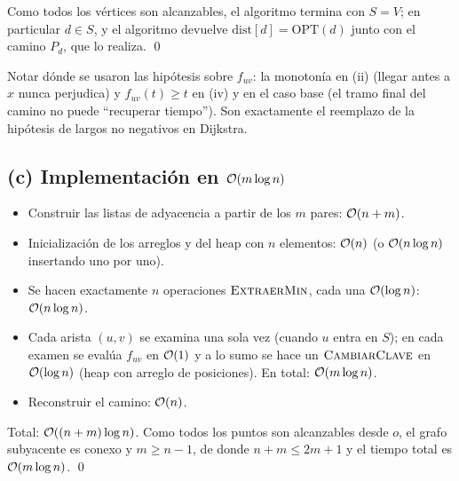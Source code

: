 Como todos los vértices son alcanzables, el algoritmo termina con $S=V$; en particular $d\in S$, y el algoritmo devuelve $\mathrm{dist}[d]=\mathrm{OPT}(d)$ junto con el camino $P_d$, que lo realiza. \qed

Notar dónde se usaron las hipótesis sobre $f_{uv}$: la monotonía en (ii) (llegar antes a $x$ nunca perjudica) y $f_{uv}(t)\ge t$ en (iv) y en el caso base (el tramo final del camino no puede ``recuperar tiempo''). Son exactamente el reemplazo de la hipótesis de largos no negativos en Dijkstra.

\subsection*{(c) Implementación en $\mathcal{O}(m\log n)$}

\begin{itemize}
\item Construir las listas de adyacencia a partir de los $m$ pares: $\mathcal{O}(n+m)$.
\item Inicialización de los arreglos y del heap con $n$ elementos: $\mathcal{O}(n)$ (o $\mathcal{O}(n\log n)$ insertando uno por uno).
\item Se hacen exactamente $n$ operaciones $\textsc{ExtraerMin}$, cada una $\mathcal{O}(\log n)$: $\mathcal{O}(n\log n)$.
\item Cada arista $(u,v)$ se examina una sola vez (cuando $u$ entra en $S$); en cada examen se evalúa $f_{uv}$ en $\mathcal{O}(1)$ y a lo sumo se hace un $\textsc{CambiarClave}$ en $\mathcal{O}(\log n)$ (heap con arreglo de posiciones). En total: $\mathcal{O}(m\log n)$.
\item Reconstruir el camino: $\mathcal{O}(n)$.
\end{itemize}
Total: $\mathcal{O}((n+m)\log n)$. Como todos los puntos son alcanzables desde $o$, el grafo subyacente es conexo y $m\ge n-1$, de donde $n+m\le 2m+1$ y el tiempo total es $\mathcal{O}(m\log n)$. \qed


